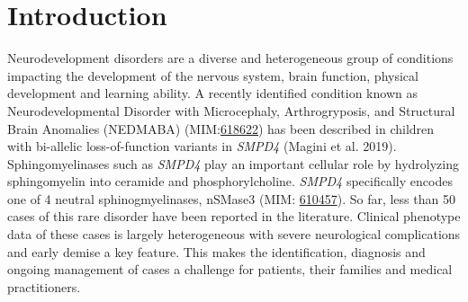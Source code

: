 \documentclass[
  letterpaper,
  DIV=11,
  numbers=noendperiod]{scrartcl}
\begin{document}
\hypertarget{introduction}{%
\section{Introduction}\label{introduction}}

Neurodevelopment disorders are a diverse and heterogeneous group of
conditions impacting the development of the nervous system, brain
function, physical development and learning ability. A recently
identified condition known as Neurodevelopmental Disorder with
Microcephaly, Arthrogryposis, and Structural Brain Anomalies (NEDMABA)
(MIM:\href{https://omim.org/entry/618622}{618622}) has been described in
children with bi-allelic loss-of-function variants in \emph{SMPD4}
(Magini et al. 2019). Sphingomyelinases such as \emph{SMPD4} play an
important cellular role by hydrolyzing sphingomyelin into ceramide and
phosphorylcholine. \emph{SMPD4} specifically encodes one of 4 neutral
sphinogmyelinases, nSMase3 (MIM:
\href{http://omim.org/entry/610457}{610457}). So far, less than 50 cases
of this rare disorder have been reported in the literature. Clinical
phenotype data of these cases is largely heterogeneous with severe
neurological complications and early demise a key feature. This makes
the identification, diagnosis and ongoing management of cases a
challenge for patients, their families and medical practitioners.
\end{document}
